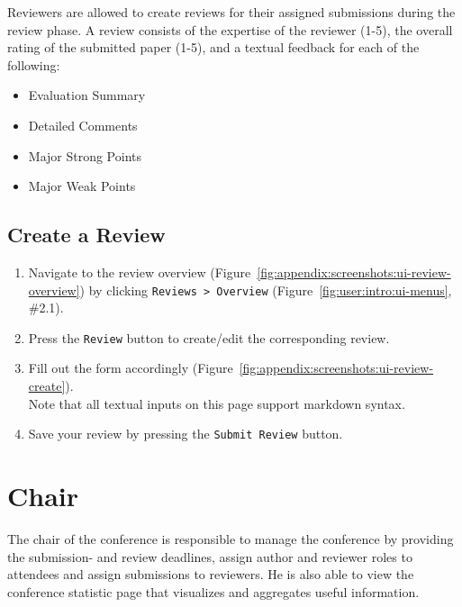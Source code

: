 \documentclass[nochapterpage,nopartpage,noheadingspace,numbersubsubsec,bigchapter,colorback,accentcolor=tud9c,10pt]{tudreport}
\begin{document}
    Reviewers are allowed to create reviews for their assigned submissions during the review phase. A review consists of the expertise of the reviewer (1-5), the overall rating of the submitted paper (1-5), and a textual feedback for each of the following:
        \begin{multicols}{2}
        \begin{itemize}
            \item Evaluation Summary
            \item Detailed Comments
            \item Major Strong Points
            \item Major Weak Points
        \end{itemize}
        \end{multicols}

  \section{Create a Review}
  \label{ch:user:reviewer:create-review}

        \begin{enumerate}
            \setlength\itemsep{0em}
            \item Navigate to the review overview (Figure~\ref{fig:appendix:screenshots:ui-review-overview}) by clicking \texttt{Reviews > Overview} (Figure~\ref{fig:user:intro:ui-menus}, \#2.1).
            \item Press the \texttt{Review} button to create/edit the corresponding review.
            \item Fill out the form accordingly (Figure~\ref{fig:appendix:screenshots:ui-review-create}).\\
            Note that all textual inputs on this page support markdown syntax.
            \item Save your review by pressing the \texttt{Submit Review} button.
        \end{enumerate}

  \chapter{Chair}
  \label{ch:user:chair}

    The chair of the conference is responsible to manage the conference by providing the submission- and review deadlines, assign author and reviewer roles to attendees and assign submissions to reviewers. He is also able to view the conference statistic page that visualizes and aggregates useful information.
\end{document}

